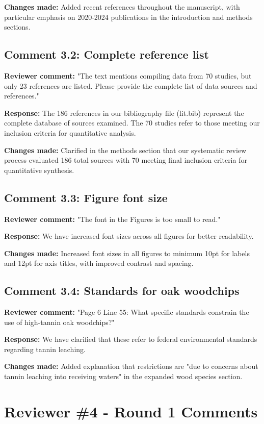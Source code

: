 \documentclass[12pt,a4paper]{article}
\begin{document}
\textbf{Changes made:} Added recent references throughout the manuscript, with particular emphasis on 2020-2024 publications in the introduction and methods sections.

\subsection{Comment 3.2: Complete reference list}
\textbf{Reviewer comment:} "The text mentions compiling data from 70 studies, but only 23 references are listed. Please provide the complete list of data sources and references."

\textbf{Response:} The 186 references in our bibliography file (lit.bib) represent the complete database of sources examined. The 70 studies refer to those meeting our inclusion criteria for quantitative analysis.

\textbf{Changes made:} Clarified in the methods section that our systematic review process evaluated 186 total sources with 70 meeting final inclusion criteria for quantitative synthesis.

\subsection{Comment 3.3: Figure font size}
\textbf{Reviewer comment:} "The font in the Figures is too small to read."

\textbf{Response:} We have increased font sizes across all figures for better readability.

\textbf{Changes made:} Increased font sizes in all figures to minimum 10pt for labels and 12pt for axis titles, with improved contrast and spacing.

\subsection{Comment 3.4: Standards for oak woodchips}
\textbf{Reviewer comment:} "Page 6 Line 55: What specific standards constrain the use of high-tannin oak woodchips?"

\textbf{Response:} We have clarified that these refer to federal environmental standards regarding tannin leaching.

\textbf{Changes made:} Added explanation that restrictions are "due to concerns about tannin leaching into receiving waters" in the expanded wood species section.

\section{Reviewer \#4 - Round 1 Comments}
\end{document}
